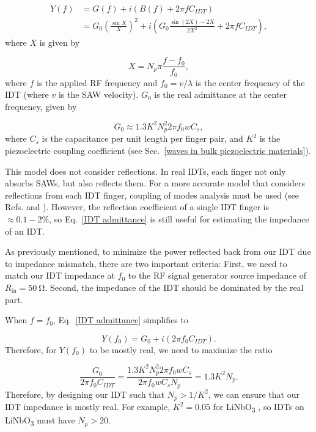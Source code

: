 \documentclass{beavtex_dub_edit}
\begin{document}
\begin{align}
    Y(f) &= G(f) + i(B(f) + 2\pi f C_{IDT})\\
    &= G_0 \left(\frac{\sin X}{X}\right)^2 + i \left(G_0 \frac{\sin (2X) - 2X}{2X^2} + 2\pi f C_{IDT}\right), \label{IDT admittance}
\end{align}
where $X$ is given by

\begin{equation}
    X = N_p \pi \frac{f - f_0}{f_0},
\end{equation}
where $f$ is the applied RF frequency and $f_0 = v/\lambda$ is the center frequency of the IDT (where $v$ is the SAW velocity). $G_0$ is the real admittance at the center frequency, given by 

\begin{equation}
    G_0 \approx 1.3 K^2 N_p^2 2 \pi f_0 w C_s,
    \label{IDT G0}
\end{equation}
where $C_s$ is the capacitance per unit length per finger pair, and $K^2$ is the piezoelectric coupling coefficient (see Sec.\ \ref{waves in bulk piezoelectric materials}).

This model does not consider reflections. In real IDTs, each finger not only absorbs SAWs, but also reflects them. For a more accurate model that considers reflections from each IDT finger, coupling of modes analysis must be used (see Refs. \cite[p.\ 140-149]{lane_integrating_2021} and \cite[Ch.\ 4]{campbell_surface_1989}). However, the reflection coefficient of a single IDT finger is $\approx 0.1-2\%$, so Eq.\ \ref{IDT admittance} is still useful for estimating the impedance of an IDT. 

As previously mentioned, to minimize the power reflected back from our IDT due to impedance mismatch, there are two important criteria: First, we need to match our IDT impedance at $f_0$ to the RF signal generator source impedance of $R_{\mathrm{in}} = \SI{50}{\ohm}$. Second, the impedance of the IDT should be dominated by the real part. 

When $f = f_0$, Eq.\ \ref{IDT admittance} simplifies to 

\begin{equation}
    Y(f_0) = G_0 + i(2\pi f_0 C_{IDT}).
\end{equation}
Therefore, for $Y(f_0)$ to be mostly real, we need to maximize the ratio

\begin{equation}
    \frac{G_0}{2\pi f_0 C_{IDT}} = \frac{1.3 K^2 N_p^2 2 \pi f_0 w C_s}{2\pi f_0 w C_s N_p} = 1.3 K^2 N_p.
    \label{G0 compared to B0}
\end{equation}
Therefore, by designing our IDT such that $N_p > 1/K^2$, we can ensure that our IDT impedance is mostly real. For example, $K^2 = 0.05$ for LiNbO\textsubscript{3} \cite{wixforth_surface_1989}, so IDTs on LiNbO\textsubscript{3} must have $N_p > 20$.
\end{document}
